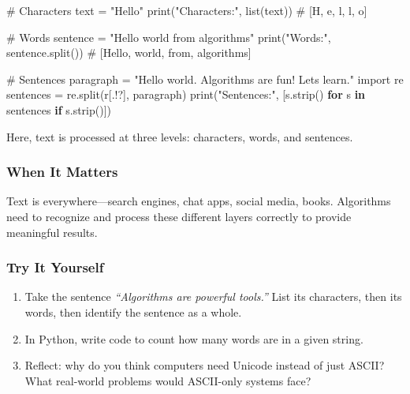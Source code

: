 \documentclass[
  letterpaper,
  DIV=11,
  numbers=noendperiod]{scrreprt}
\newenvironment{Shaded}{\begin{snugshade}}{\end{snugshade}}
\newcommand{\BuiltInTok}[1]{\textcolor[rgb]{0.00,0.23,0.31}{#1}}
\newcommand{\CommentTok}[1]{\textcolor[rgb]{0.37,0.37,0.37}{#1}}
\newcommand{\ControlFlowTok}[1]{\textcolor[rgb]{0.00,0.23,0.31}{\textbf{#1}}}
\newcommand{\ImportTok}[1]{\textcolor[rgb]{0.00,0.46,0.62}{#1}}
\newcommand{\KeywordTok}[1]{\textcolor[rgb]{0.00,0.23,0.31}{\textbf{#1}}}
\newcommand{\NormalTok}[1]{\textcolor[rgb]{0.00,0.23,0.31}{#1}}
\newcommand{\OperatorTok}[1]{\textcolor[rgb]{0.37,0.37,0.37}{#1}}
\newcommand{\PreprocessorTok}[1]{\textcolor[rgb]{0.68,0.00,0.00}{#1}}
\newcommand{\StringTok}[1]{\textcolor[rgb]{0.13,0.47,0.30}{#1}}
\newcommand{\VerbatimStringTok}[1]{\textcolor[rgb]{0.13,0.47,0.30}{#1}}
\providecommand{\tightlist}{%
  \setlength{\itemsep}{0pt}\setlength{\parskip}{0pt}}
\begin{document}
\begin{Shaded}
\begin{Highlighting}[]
\CommentTok{\# Characters}
\NormalTok{text }\OperatorTok{=} \StringTok{"Hello"}
\BuiltInTok{print}\NormalTok{(}\StringTok{"Characters:"}\NormalTok{, }\BuiltInTok{list}\NormalTok{(text))  }\CommentTok{\# [\textquotesingle{}H\textquotesingle{}, \textquotesingle{}e\textquotesingle{}, \textquotesingle{}l\textquotesingle{}, \textquotesingle{}l\textquotesingle{}, \textquotesingle{}o\textquotesingle{}]}

\CommentTok{\# Words}
\NormalTok{sentence }\OperatorTok{=} \StringTok{"Hello world from algorithms"}
\BuiltInTok{print}\NormalTok{(}\StringTok{"Words:"}\NormalTok{, sentence.split())  }\CommentTok{\# [\textquotesingle{}Hello\textquotesingle{}, \textquotesingle{}world\textquotesingle{}, \textquotesingle{}from\textquotesingle{}, \textquotesingle{}algorithms\textquotesingle{}]}

\CommentTok{\# Sentences}
\NormalTok{paragraph }\OperatorTok{=} \StringTok{"Hello world. Algorithms are fun! Let\textquotesingle{}s learn."}
\ImportTok{import}\NormalTok{ re}
\NormalTok{sentences }\OperatorTok{=}\NormalTok{ re.split(}\VerbatimStringTok{r\textquotesingle{}}\PreprocessorTok{[.!?]}\VerbatimStringTok{\textquotesingle{}}\NormalTok{, paragraph)}
\BuiltInTok{print}\NormalTok{(}\StringTok{"Sentences:"}\NormalTok{, [s.strip() }\ControlFlowTok{for}\NormalTok{ s }\KeywordTok{in}\NormalTok{ sentences }\ControlFlowTok{if}\NormalTok{ s.strip()])}
\end{Highlighting}
\end{Shaded}

Here, text is processed at three levels: characters, words, and
sentences.

\subsubsection{When It Matters}\label{when-it-matters-49}

Text is everywhere---search engines, chat apps, social media, books.
Algorithms need to recognize and process these different layers
correctly to provide meaningful results.

\subsubsection{Try It Yourself}\label{try-it-yourself-51}

\begin{enumerate}
\def\labelenumi{\arabic{enumi}.}
\tightlist
\item
  Take the sentence \emph{``Algorithms are powerful tools.''} List its
  characters, then its words, then identify the sentence as a whole.
\item
  In Python, write code to count how many words are in a given string.
\item
  Reflect: why do you think computers need Unicode instead of just
  ASCII? What real-world problems would ASCII-only systems face?
\end{enumerate}
\end{document}
